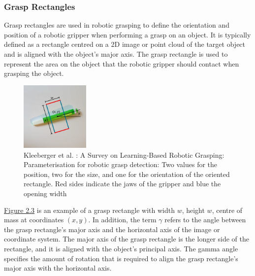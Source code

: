 \documentclass[11pt, a4paper]{report}
\begin{document}
\subsubsection{Grasp Rectangles}\label{sec:2.1.2.1}
Grasp rectangles are used in robotic grasping to define the orientation and position of a robotic gripper when performing a grasp on an object. It is typically defined as a rectangle centred on a 2D image or point cloud of the target object and is aligned with the object's major axis. The grasp rectangle is used to represent the area on the object that the robotic gripper should contact when grasping the object.
\begin{figure}[H]
    \centering
    \includegraphics[width=0.3\textwidth]{docs/Project Report/Media/2_1_2_grasp_rectangle_definition.png}
    \caption{Kleeberger et al. \cite{kleeberger2020}: A Survey on Learning-Based Robotic Grasping: Parameterisation for robotic grasp detection: Two values for the position, two for the size, and one for the orientation of the oriented rectangle. Red sides indicate the jaws of the gripper and blue the opening width}
    \label{fig:2.3}
\end{figure}
\hyperref[fig:2.3]{Figure 2.3} is an example of a grasp rectangle with width $w$, height $w$, centre of mass at coordinates $(x,y)$. In addition, the term $\gamma$ refers to the angle between the grasp rectangle's major axis and the horizontal axis of the image or coordinate system. The major axis of the grasp rectangle is the longer side of the rectangle, and it is aligned with the object's principal axis. The gamma angle specifies the amount of rotation that is required to align the grasp rectangle's major axis with the horizontal axis.\\
\end{document}
